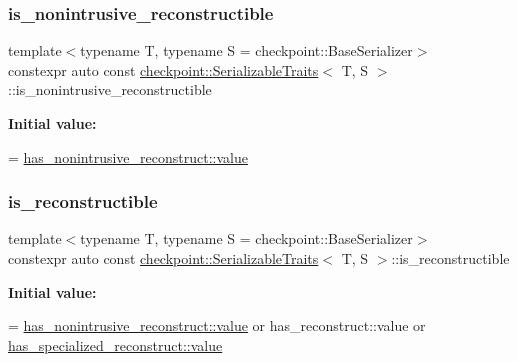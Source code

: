 \subsubsection{\texorpdfstring{is\+\_\+nonintrusive\+\_\+reconstructible}{is\_nonintrusive\_reconstructible}}
{\footnotesize\ttfamily template$<$typename T, typename S = checkpoint\+::\+Base\+Serializer$>$ \\
constexpr auto const \hyperlink{structcheckpoint_1_1_serializable_traits}{checkpoint\+::\+Serializable\+Traits}$<$ T, S $>$\+::is\+\_\+nonintrusive\+\_\+reconstructible\hspace{0.3cm}{\ttfamily [static]}}

{\bfseries Initial value\+:}
\begin{DoxyCode}
=
    \hyperlink{structdetection_1_1detector_a6d7d0e1bdf5903db9edbe448edccf83b}{has\_nonintrusive\_reconstruct::value}
\end{DoxyCode}
\mbox{\label{structcheckpoint_1_1_serializable_traits_a6cc78a7cc9b4645727c92437619fce83}} 
\subsubsection{\texorpdfstring{is\+\_\+reconstructible}{is\_reconstructible}}
{\footnotesize\ttfamily template$<$typename T, typename S = checkpoint\+::\+Base\+Serializer$>$ \\
constexpr auto const \hyperlink{structcheckpoint_1_1_serializable_traits}{checkpoint\+::\+Serializable\+Traits}$<$ T, S $>$\+::is\+\_\+reconstructible\hspace{0.3cm}{\ttfamily [static]}}

{\bfseries Initial value\+:}
\begin{DoxyCode}
=
    \hyperlink{structdetection_1_1detector_a6d7d0e1bdf5903db9edbe448edccf83b}{has\_nonintrusive\_reconstruct::value} or
    has\_reconstruct::value or
    \hyperlink{structdetection_1_1detector_a6d7d0e1bdf5903db9edbe448edccf83b}{has\_specialized\_reconstruct::value}
\end{DoxyCode}
\mbox{\label{structcheckpoint_1_1_serializable_traits_a3941c4fcb5397fe564a3453857aa9183}} 
